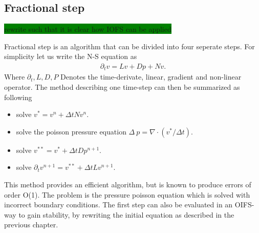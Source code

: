 \subsection{Fractional step}
\colorbox{green}{rewrite such that it is clear how IOFS can be applied}


Fractional step is an algorithm that can be divided into four seperate steps. For simplicity let us write the N-S
equation as 
\begin{align}
    \partial_t v = Lv + Dp + Nv.
    \label{eq:NSfracstep}
\end{align}
Where $\partial_t, L,D,P$ Denotes the time-derivate, linear, gradient and non-linear operator. 
The method describing one time-step can then be summarized as following
\begin{itemize}
    \item solve $v^* = v^n + \Delta t Nv^n$.
    \item solve the poisson pressure equation $\Delta\: p = \nabla \cdot (v^*/\Delta t)$.
    \item solve $v^{**} =v^* + \Delta t Dp^{n+1}$.
    \item solve $\partial_t v^{n+1}=v^{**} + \Delta t Lv^{n+1}$.
\end{itemize}
This method provides an efficient algorithm, but is known to produce errors of order O(1).
The problem is the pressure poisson equation which is solved with incorrect boundary 
conditions. The first step can also be evaluated in an OIFS-way to gain stability, by rewriting the initial equation 
as described in the previous chapter. 



